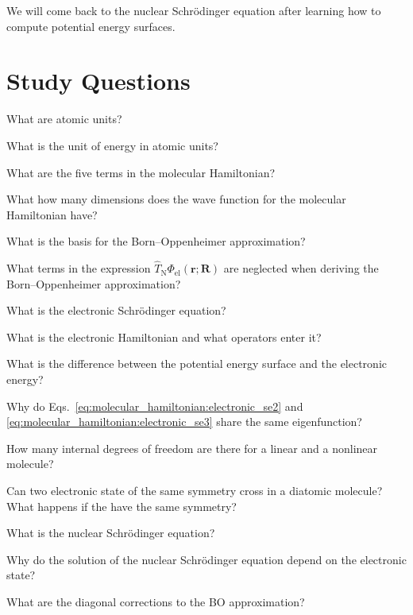 \documentclass[../Main/chem532-notes.tex]{subfiles}
\begin{document}
We will come back to the nuclear Schr\"{o}dinger equation after learning how to compute potential energy surfaces.

\section*{Study Questions}
\begin{myenumerate}
\item What are atomic units?
\item What is the unit of energy in atomic units?
\item What are the five terms in the molecular Hamiltonian?
\item What how many dimensions does the wave function for the molecular Hamiltonian have?
\item What is the basis for the Born--Oppenheimer approximation?
\item What terms in the expression $\hat{T}_\mathrm{N}  \Phi_{\mathrm{el}}(\mathbf{r};\mathbf{R})$ are neglected when deriving the Born--Oppenheimer approximation?
\item What is the electronic Schr\"{o}dinger equation?
\item What is the electronic Hamiltonian and what operators enter it?
\item What is the difference between the potential energy surface and the electronic energy?
\item Why do Eqs.~\eqref{eq:molecular_hamiltonian:electronic_se2} and \eqref{eq:molecular_hamiltonian:electronic_se3} share the same eigenfunction?
\item How many internal degrees of freedom are there for a linear and a nonlinear molecule?
\item Can two electronic state of the same symmetry cross in a diatomic molecule? What happens if the have the same symmetry?
\item What is the nuclear Schr\"{o}dinger equation?
\item Why do the solution of the nuclear Schr\"{o}dinger equation depend on the electronic state?
\item What are the diagonal corrections to the BO approximation?
\end{myenumerate}
\end{document}
